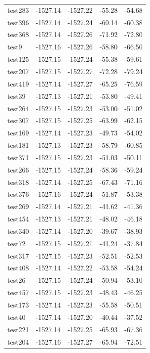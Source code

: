 \documentclass[journal=jacsat,manuscript=article]{achemso}
\begin{document}
\begin{table}[b!]
\begin{tabular}{lrrrr}
test283 &  -1527.14 &  -1527.22 &  -55.28 &  -54.68 \\
test396 &  -1527.14 &  -1527.24 &  -60.14 &  -60.38 \\
test368 &  -1527.14 &  -1527.26 &  -71.92 &  -72.80 \\
test9   &  -1527.16 &  -1527.26 &  -58.80 &  -66.50 \\
test125 &  -1527.15 &  -1527.24 &  -55.38 &  -59.61 \\
test207 &  -1527.15 &  -1527.27 &  -72.28 &  -79.24 \\
test419 &  -1527.14 &  -1527.27 &  -65.25 &  -76.59 \\
test39  &  -1527.13 &  -1527.21 &  -53.80 &  -49.41 \\
test264 &  -1527.15 &  -1527.23 &  -53.00 &  -51.02 \\
test307 &  -1527.15 &  -1527.25 &  -63.99 &  -62.15 \\
test169 &  -1527.14 &  -1527.23 &  -49.73 &  -54.02 \\
test181 &  -1527.13 &  -1527.23 &  -58.79 &  -60.85 \\
test371 &  -1527.15 &  -1527.23 &  -51.03 &  -50.11 \\
test266 &  -1527.15 &  -1527.24 &  -58.36 &  -59.24 \\
test318 &  -1527.14 &  -1527.25 &  -67.43 &  -71.16 \\
test376 &  -1527.16 &  -1527.24 &  -51.87 &  -53.38 \\
test269 &  -1527.14 &  -1527.21 &  -41.62 &  -41.36 \\
test454 &  -1527.13 &  -1527.21 &  -48.02 &  -46.18 \\
test340 &  -1527.14 &  -1527.20 &  -39.67 &  -38.93 \\
test72  &  -1527.15 &  -1527.21 &  -41.24 &  -37.84 \\
test317 &  -1527.15 &  -1527.23 &  -52.51 &  -52.53 \\
test408 &  -1527.14 &  -1527.22 &  -53.58 &  -54.24 \\
test26  &  -1527.15 &  -1527.24 &  -50.94 &  -53.10 \\
test457 &  -1527.15 &  -1527.23 &  -48.43 &  -46.25 \\
test173 &  -1527.14 &  -1527.23 &  -55.58 &  -50.51 \\
test40  &  -1527.14 &  -1527.20 &  -40.44 &  -37.52 \\
test221 &  -1527.14 &  -1527.25 &  -65.93 &  -67.36 \\
test204 &  -1527.16 &  -1527.27 &  -65.94 &  -72.51 \\

\end{tabular}
\end{table}
\end{document}

